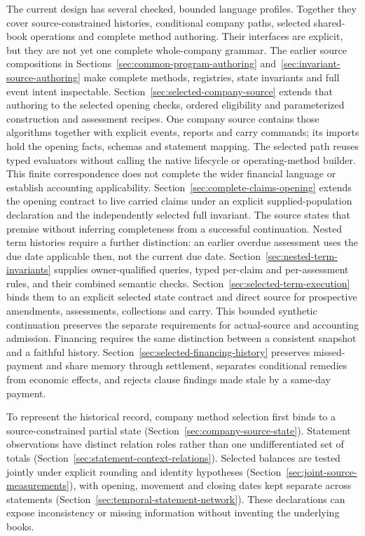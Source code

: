 The current design has several checked, bounded language profiles. Together
they cover source-constrained histories, conditional company paths, selected
shared-book operations and complete method authoring. Their interfaces are
explicit, but they are not yet one complete whole-company grammar.
The earlier source compositions in Sections~\ref{sec:common-program-authoring}
and~\ref{sec:invariant-source-authoring} make complete methods, registries,
state invariants and full event intent inspectable. Section~\ref{sec:selected-company-source}
extends that authoring to the selected opening checks, ordered eligibility
and parameterized construction and assessment recipes. One company source
contains those algorithms together with explicit events, reports and carry
commands; its imports hold the opening facts, schemas and statement mapping.
The selected path reuses typed evaluators without calling the native lifecycle
or operating-method builder. This finite correspondence does not complete
the wider financial language or establish accounting applicability.
Section~\ref{sec:complete-claims-opening} extends the opening contract
to live carried claims under an explicit supplied-population declaration
and the independently selected full invariant. The source states that
premise without inferring completeness from a successful continuation.
Nested term histories require a further distinction: an earlier overdue
assessment uses the due date applicable then, not the current due date.
Section~\ref{sec:nested-term-invariants} supplies owner-qualified queries,
typed per-claim and per-assessment rules, and their combined semantic checks.
Section~\ref{sec:selected-term-execution} binds them to an explicit selected
state contract and direct source for prospective amendments, assessments,
collections and carry. This bounded synthetic continuation preserves the
separate requirements for actual-source and accounting admission.
Financing requires the same distinction between a consistent snapshot and a
faithful history. Section~\ref{sec:selected-financing-history} preserves
missed-payment and share memory through settlement, separates conditional
remedies from economic effects, and rejects clause findings made stale by a
same-day payment.

To represent the historical record, company method selection first binds to
a source-constrained partial state
(Section~\ref{sec:company-source-state}). Statement observations have
distinct relation roles rather than one undifferentiated set of totals
(Section~\ref{sec:statement-context-relations}). Selected balances are tested
jointly under explicit rounding and identity hypotheses
(Section~\ref{sec:joint-source-measurements}), with opening, movement and
closing dates kept separate across statements
(Section~\ref{sec:temporal-statement-network}). These declarations can expose
inconsistency or missing information without inventing the underlying books.

